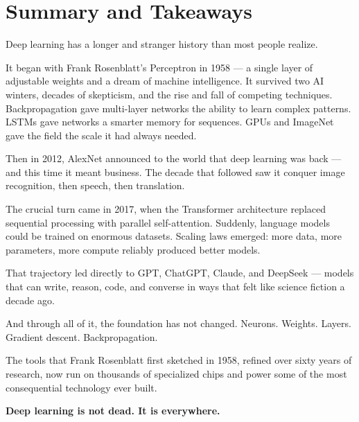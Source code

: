 \section{Summary and Takeaways}

Deep learning has a longer and stranger history than most people realize.

It began with Frank Rosenblatt's Perceptron in 1958 --- a single layer of adjustable weights and a dream of machine intelligence.
It survived two AI winters, decades of skepticism, and the rise and fall of competing techniques.
Backpropagation gave multi-layer networks the ability to learn complex patterns.
LSTMs gave networks a smarter memory for sequences.
GPUs and ImageNet gave the field the scale it had always needed.

Then in 2012, AlexNet announced to the world that deep learning was back --- and this time it meant business.
The decade that followed saw it conquer image recognition, then speech, then translation.

The crucial turn came in 2017, when the Transformer architecture replaced sequential processing with parallel self-attention.
Suddenly, language models could be trained on enormous datasets.
Scaling laws emerged: more data, more parameters, more compute reliably produced better models.

That trajectory led directly to GPT, ChatGPT, Claude, and DeepSeek --- models that can write, reason, code, and converse in ways that felt like science fiction a decade ago.

And through all of it, the foundation has not changed.
Neurons. Weights. Layers. Gradient descent. Backpropagation.

The tools that Frank Rosenblatt first sketched in 1958, refined over sixty years of research, now run on thousands of specialized chips and power some of the most consequential technology ever built.

\textbf{Deep learning is not dead. It is everywhere.}
